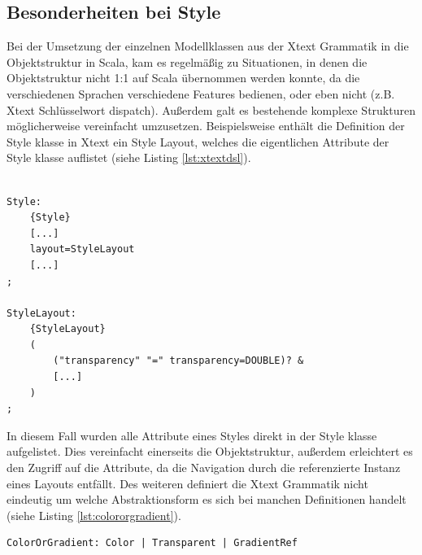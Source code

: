 \subsection{Besonderheiten bei Style}\label{specialstyle}
Bei der Umsetzung der einzelnen Modellklassen aus der Xtext Grammatik in die Objektstruktur in Scala, kam es regelmäßig zu Situationen, in denen die Objektstruktur nicht 1:1 auf Scala übernommen werden konnte, da die verschiedenen Sprachen verschiedene Features bedienen, oder eben nicht (z.B. Xtext Schlüsselwort dispatch). Außerdem galt es bestehende komplexe Strukturen möglicherweise vereinfacht umzusetzen. Beispielsweise enthält die Definition der Style klasse in Xtext ein Style Layout, welches die eigentlichen Attribute der Style klasse auflistet (siehe Listing \ref{lst:xtextdsl}).\\\\
\begin{lstlisting}[style=spray, caption={stark vereinfachter Auszug aus der Xtext Grammatik, die Styles beschreibt}, label = {lst:xtextdsl}]
Style:
    {Style}
    [...]
    layout=StyleLayout
    [...]
;
	
StyleLayout: 
    {StyleLayout}
    (
        ("transparency" "=" transparency=DOUBLE)? &
        [...]
    )
;
\end{lstlisting}
In diesem Fall wurden alle Attribute eines Styles direkt in der Style klasse aufgelistet. Dies vereinfacht einerseits die Objektstruktur, außerdem erleichtert es den Zugriff auf die Attribute, da die Navigation durch die referenzierte Instanz eines Layouts entfällt. Des weiteren definiert die Xtext Grammatik nicht eindeutig um welche Abstraktionsform es sich bei manchen Definitionen handelt (siehe Listing \ref{lst:colororgradient}).
\begin{lstlisting}[style=spray, caption = {Auszug aus der Style.xtext Grammatik, Definition der ColorOrGradient}, label = {lst:colororgradient}]
ColorOrGradient: Color | Transparent | GradientRef
\end{lstlisting}
